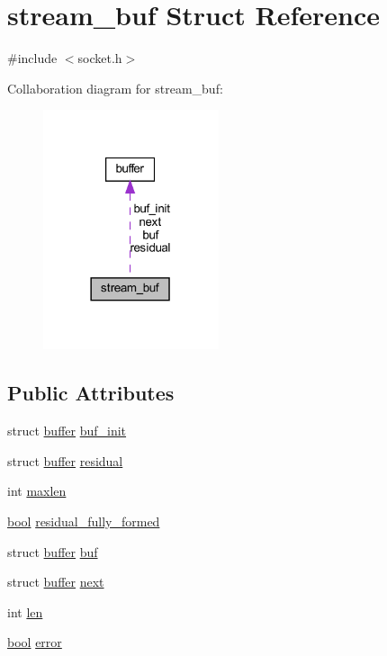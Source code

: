 \hypertarget{structstream__buf}{}\section{stream\+\_\+buf Struct Reference}
\label{structstream__buf}


{\ttfamily \#include $<$socket.\+h$>$}



Collaboration diagram for stream\+\_\+buf\+:
\nopagebreak
\begin{figure}[H]
\begin{center}
\leavevmode
\includegraphics[width=146pt]{structstream__buf__coll__graph}
\end{center}
\end{figure}
\subsection*{Public Attributes}
\begin{DoxyCompactItemize}
\item 
struct \hyperlink{structbuffer}{buffer} \hyperlink{structstream__buf_addbcd816522dd12dd7736dd746924e40}{buf\+\_\+init}
\item 
struct \hyperlink{structbuffer}{buffer} \hyperlink{structstream__buf_a4b9282d70e2db74ec58403a72b40d8fd}{residual}
\item 
int \hyperlink{structstream__buf_a5f550fd44036c75a09eec163b348f17f}{maxlen}
\item 
\hyperlink{automatic_8c_abb452686968e48b67397da5f97445f5b}{bool} \hyperlink{structstream__buf_a592d8c48a600ddfaf113fc455f5db033}{residual\+\_\+fully\+\_\+formed}
\item 
struct \hyperlink{structbuffer}{buffer} \hyperlink{structstream__buf_a14ba0df037097bc7e378cbe3e0926f92}{buf}
\item 
struct \hyperlink{structbuffer}{buffer} \hyperlink{structstream__buf_a9ffcabf271af0767607d3282493109f4}{next}
\item 
int \hyperlink{structstream__buf_a99b565a42e31b798ba7e0677ce93ddbb}{len}
\item 
\hyperlink{automatic_8c_abb452686968e48b67397da5f97445f5b}{bool} \hyperlink{structstream__buf_a27706ecb8f85530569e0d603223c31a0}{error}
\end{DoxyCompactItemize}


